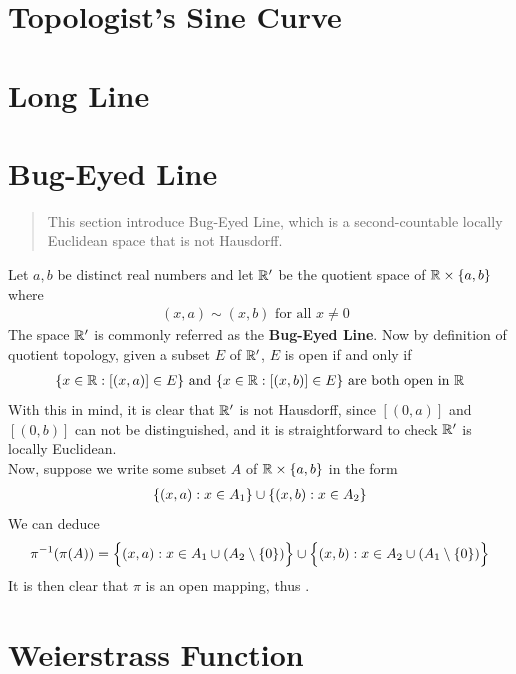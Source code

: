 \documentclass{report}
\begin{document}
\section{Topologist's Sine Curve}
\section{Long Line}
\label{Long Line}
\section{Bug-Eyed Line}
\label{Bug-Eyed Line}
\begin{abstract}
This section introduce Bug-Eyed Line, which is a second-countable locally Euclidean space that is not Hausdorff.
\end{abstract}
\begin{mdframed}
Let $a,b$ be distinct real numbers and let $\mathbb{R}'$ be the quotient space of $\mathbb{R}\times \{ a,b \}$ where 
\begin{align*}
  (x,a)\sim (x,b)\text{ for all $x\neq 0$ }
\end{align*}
The space $\mathbb{R}'$ is commonly referred as the  \textbf{Bug-Eyed Line}. Now by definition of quotient topology, given a subset $E$ of  $\mathbb{R}'$, $E $ is open if and only if 
\begin{align*}
  \{ x\in\mathbb{R}:[(x,a)]\in E \}\text{ and }\{ x\in\mathbb{R}:[(x,b)]\in E \}\text{ are both open in }\mathbb{R}
\end{align*}
With this in mind, it is clear that $\mathbb{R}'$ is not Hausdorff, since  $[(0,a)]$ and $[(0,b)]$ can not be distinguished, and it is straightforward to check $\mathbb{R}'$ is locally Euclidean.\\


Now, suppose we write some subset $A$ of $\mathbb{R}\times \{ a,b \}$ in the form  
\begin{align*}
\{ (x,a):x \in A_1 \}\cup  \{ (x,b):x \in A_2 \}
\end{align*}
We can deduce
\begin{align*}
\pi^{-1}(\pi (A))=\Big\{ (x,a): x\in A_1 \cup (A_2\setminus \{ 0 \}) \Big\}\cup  \Big\{ (x,b):x \in A_2 \cup  (A_1\setminus \{ 0 \}) \Big\}
\end{align*}
It is then clear that $\pi$ is an open mapping, thus .
\end{mdframed}

\section{Weierstrass Function}
\end{document}
